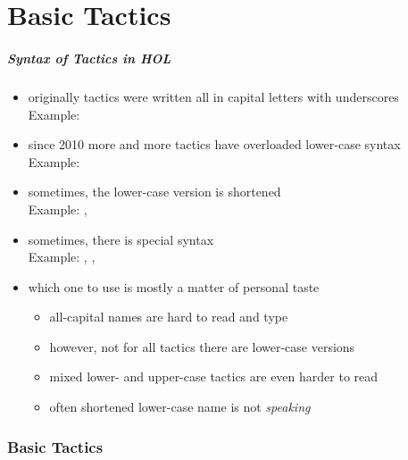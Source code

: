 \part{Basic Tactics}

\frame[plain]{\partpage}

\begin{frame}
\frametitle{Syntax of Tactics in HOL}
\begin{itemize}
\item originally tactics were written all in capital letters with underscores\\
Example: 
\item since 2010 more and more tactics have overloaded lower-case syntax\\
Example: 
\item sometimes, the lower-case version is shortened\\
Example: , 
\item sometimes, there is special syntax\\
Example: , \hol{\textbsl{}\textbsl{}}, \hol{>>} 
\item which one to use is mostly a matter of personal taste
\begin{itemize}
\item all-capital names are hard to read and type
\item however, not for all tactics there are lower-case versions
\item mixed lower- and upper-case tactics are even harder to read
\item often shortened lower-case name is not \textit{speaking}
\end{itemize}
\end{itemize}
\end{frame}


\section{Basic Tactics}

